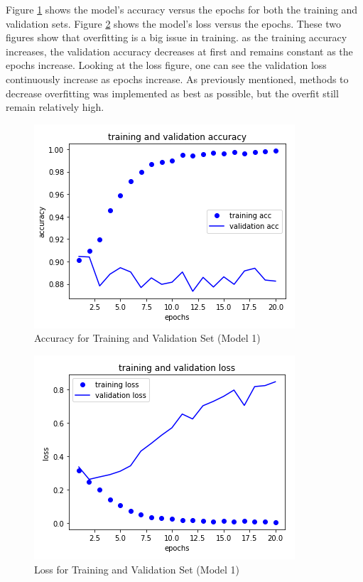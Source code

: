 \documentclass[11pt,a4paper]{article}
\begin{document}
Figure \ref{fig:plot_accuracy} shows the model's accuracy versus the epochs for both the training and validation sets. Figure \ref{fig:plot_loss} shows the model's loss versus the epochs. These two figures show that overfitting is a big issue in training. as the training accuracy increases, the validation accuracy decreases at first and remains constant as the epochs increase. Looking at the loss figure, one can see the validation loss continuously increase as epochs increase. As previously mentioned, methods to decrease overfitting was implemented as best as possible, but the overfit still remain relatively high. 

\begin{figure}[t]
\includegraphics[scale=0.5]{plot_accuracy.png}
\centering
\caption{Accuracy for Training and Validation Set (Model 1)}
\label{fig:plot_accuracy}
\end{figure}

\begin{figure}[t]
\includegraphics[scale=0.5]{plot_loss.png}
\centering
\caption{Loss for Training and Validation Set (Model 1)}
\label{fig:plot_loss}
\end{figure}
\end{document}

